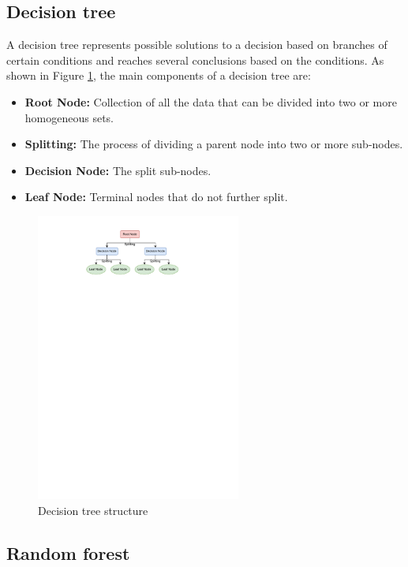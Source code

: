 \subsection{Decision tree}

A decision tree \cite{song2015decision} represents possible solutions to a decision based on branches of certain conditions and reaches several conclusions based on the conditions. As shown in Figure \ref{fig_decision_tree}, the main components of a decision tree are:

\begin{itemize}
\item \textbf{Root Node:} Collection of all the data that can be divided into two or more homogeneous sets.
\item \textbf{Splitting:} The process of dividing a parent node into two or more sub-nodes.
\item \textbf{Decision Node:} The split sub-nodes.
\item \textbf{Leaf Node:} Terminal nodes that do not further split.
\end{itemize}

\begin{figure}[H]
    \centering
    \includegraphics[width=0.6\textwidth]{figures/decision-tree.pdf}
    \caption{Decision tree structure}
    \label{fig_decision_tree}
\end{figure}

\subsection{Random forest}

